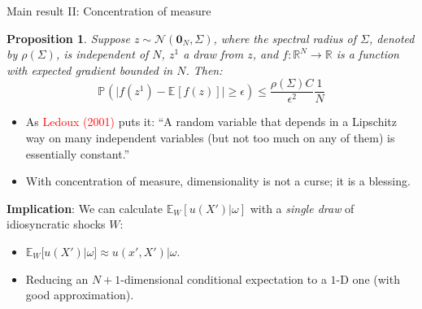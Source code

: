 \documentclass[aspectratio=169,10pt]{beamer}
\newcommand{\emphcolor}[1]{\textbf{\textcolor{emphcolorval}{#1}}}
\newtheorem{proposition}{Proposition}
\newcommand{\prob}[2][]{\ensuremath{\mathbb{P}_{#1}\left( {#2} \right)}}
\newcommand{\expec}[2][]{\ensuremath{\mathbb{E}_{{#1}}\left[ {#2} \right]}}
\begin{document}
		
		\begin{frame}[label=concentration]{Main result II: Concentration of measure}\label{Concentration}
			\begin{proposition}
				Suppose $z \sim \mathcal{N}(\mathbf{0}_N,\Sigma)$, where the spectral radius of $\Sigma$, denoted by $\rho(\Sigma)$, is independent of $N$, $z^1$ a draw from $z$, and $f:\mathbb{R}^N \rightarrow \mathbb{R}$ is a function with expected gradient bounded in $N$. Then:
				\begin{equation*}
					\prob{\big|f(z^1)-\expec{f(z)}\big|\geq \epsilon} \leq \frac{\rho(\Sigma) C}{\epsilon^2} \frac{1}{N}
				\end{equation*}
				\vspace{-0.2in}
			\end{proposition}
			\begin{itemize}
				\item As \textcolor{red}{Ledoux (2001)} puts it: ``A random variable that depends in a Lipschitz way on many independent variables (but not too much on any of them) is essentially constant.''\vspace{0.1in}
				\item With concentration of measure, dimensionality is not a curse; it is a blessing.\vspace{0.1in}
			\end{itemize}
			\emphcolor{Implication}: We can calculate $\mathbb{E}_{W}[u(X')| \omega]$ with a \textit{single draw} of idiosyncratic shocks $W$:
			\begin{itemize}
				\item $\mathbb{E}_W[u(X')|\omega]\approx u(x',X')|\omega$.\vspace{0.1in} 
				\item Reducing an $N+1$-dimensional conditional expectation to a $1$-D one (with good approximation). 
			\end{itemize}
\end{frame}
\end{document}
